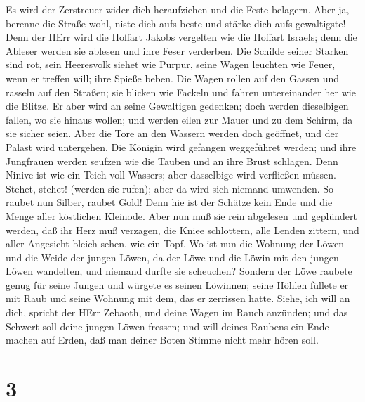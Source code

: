  Es wird der Zerstreuer wider dich heraufziehen und die
Feste belagern. Aber ja, berenne die Straße wohl, niste dich aufs beste
und stärke dich aufs gewaltigste!  Denn der HErr wird die
Hoffart Jakobs vergelten wie die Hoffart Israels; denn die Ableser
werden sie ablesen und ihre Feser verderben.  Die Schilde
seiner Starken sind rot, sein Heeresvolk siehet wie Purpur, seine Wagen
leuchten wie Feuer, wenn er treffen will; ihre Spieße beben.
 Die Wagen rollen auf den Gassen und rasseln auf den
Straßen; sie blicken wie Fackeln und fahren untereinander her wie die
Blitze.  Er aber wird an seine Gewaltigen gedenken; doch
werden dieselbigen fallen, wo sie hinaus wollen; und werden eilen zur
Mauer und zu dem Schirm, da sie sicher seien.  Aber die Tore
an den Wassern werden doch geöffnet, und der Palast wird untergehen.
 Die Königin wird gefangen weggeführet werden; und ihre
Jungfrauen werden seufzen wie die Tauben und an ihre Brust schlagen.
 Denn Ninive ist wie ein Teich voll Wassers; aber dasselbige
wird verfließen müssen. Stehet, stehet! (werden sie rufen); aber da wird
sich niemand umwenden.  So raubet nun Silber, raubet Gold!
Denn hie ist der Schätze kein Ende und die Menge aller köstlichen
Kleinode.  Aber nun muß sie rein abgelesen und geplündert
werden, daß ihr Herz muß verzagen, die Kniee schlottern, alle Lenden
zittern, und aller Angesicht bleich sehen, wie ein Topf. 
Wo ist nun die Wohnung der Löwen und die Weide der jungen Löwen, da der
Löwe und die Löwin mit den jungen Löwen wandelten, und niemand durfte
sie scheuchen?  Sondern der Löwe raubete genug für seine
Jungen und würgete es seinen Löwinnen; seine Höhlen füllete er mit Raub
und seine Wohnung mit dem, das er zerrissen hatte.  Siehe,
ich will an dich, spricht der HErr Zebaoth, und deine Wagen im Rauch
anzünden; und das Schwert soll deine jungen Löwen fressen; und will
deines Raubens ein Ende machen auf Erden, daß man deiner Boten Stimme
nicht mehr hören soll.

\hypertarget{section-2}{%
\section{3}\label{section-2}}

